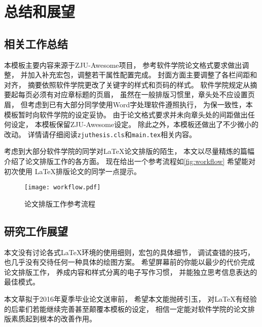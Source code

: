 
\chapter{总结和展望}

\section{相关工作总结}

本模板主要内容来源于ZJU-Awesome项目，
参考软件学院论文格式要求做出调整，
并加入补充宏包，调整若干属性配置完成。
封面方面主要调整了各栏间距和对齐，
摘要依照软件学院更改了关键字的样式和页码的样式。
软件学院规定从摘要起每页必须有对应章标题的页眉，
虽然在一般排版习惯里，章头处不应设置页眉，
但考虑到已有大部分同学使用Word字处理软件遵照执行，
为保一致性，本模板暂时向软件学院的设定妥协。
由于论文格式要求并未向章头处的间距做出任何设定，
本模板保留ZJU-Awesome设定。
除此之外，本模板还做出了不少微小的改动。
详情请仔细阅读\texttt{zjuthesis.cls}和\texttt{main.tex}相关内容。

考虑到大部分软件学院的同学对\LaTeX 论文排版的陌生，
本文以尽量精炼的篇幅介绍了论文排版工作的各方面。
现在给出一个参考流程如\autoref{fig:workflow} 希望能对初次使用
\LaTeX 排版论文的同学一点提示。

\begin{figure}[htbp]
    \centering
    \texttt{[image: workflow.pdf]}
    \caption{论文排版工作参考流程}
    \label{fig:workflow}
\end{figure}

\section{研究工作展望}

本文没有讨论各式\LaTeX 环境的使用细则，宏包的具体细节，
调试查错的技巧，也几乎没有交待任何一种具体的绘图方案。
希望屏幕前的你能以最少的代价完成论文排版工作，
养成内容和样式分离的电子写作习惯，
并能独立思考信息表达的最佳模式。

本文草拟于2016年夏季毕业论文送审前，
希望本文能抛砖引玉，
对\LaTeX 有经验的后辈们若能继续完善甚至颠覆本模板的设定，
相信一定能对软件学院的论文排版素质起到根本的改善作用。
